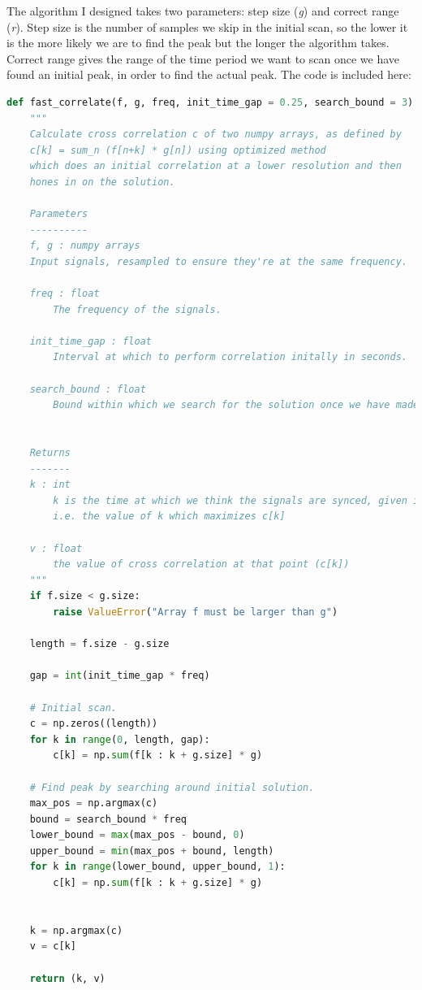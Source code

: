 \documentclass[12pt,a4paper,twoside,openright]{report}
\begin{document}
The algorithm I designed takes two parameters: step size (\emph{g}) and
correct range (\emph{r}). Step size is the number of samples we skip in the initial scan, so the
lower it is the more likely we are to find the peak but the longer the
algorithm takes. Correct range gives the range of the time period we want to
scan once we have found an initial peak, in order to find the actual peak. The
code is included here:
\begin{lstlisting}[language=Python]
def fast_correlate(f, g, freq, init_time_gap = 0.25, search_bound = 3):
    """
    Calculate cross correlation c of two numpy arrays, as defined by 
    c[k] = sum_n (f[n+k] * g[n]) using optimized method 
    which does an initial correlation at a lower resolution and then 
    hones in on the solution.

    Parameters
    ----------
    f, g : numpy arrays
    Input signals, resampled to ensure they're at the same frequency.

    freq : float
        The frequency of the signals.

    init_time_gap : float
        Interval at which to perform correlation initally in seconds. 

    search_bound : float
        Bound within which we search for the solution once we have made an initial pass.
        

    Returns
    -------
    k : int
        k is the time at which we think the signals are synced, given in terms of the number of samples through f we are.
        i.e. the value of k which maximizes c[k]

    v : float
        the value of cross correlation at that point (c[k])
    """
    if f.size < g.size:
        raise ValueError("Array f must be larger than g")

    length = f.size - g.size

    gap = int(init_time_gap * freq)

    # Initial scan.
    c = np.zeros((length))
    for k in range(0, length, gap):
        c[k] = np.sum(f[k : k + g.size] * g)

    # Find peak by searching around initial solution.
    max_pos = np.argmax(c)
    bound = search_bound * freq
    lower_bound = max(max_pos - bound, 0)
    upper_bound = min(max_pos + bound, length)
    for k in range(lower_bound, upper_bound, 1):
        c[k] = np.sum(f[k : k + g.size] * g)


    k = np.argmax(c)
    v = c[k]

    return (k, v)
\end{lstlisting}
\end{document}
